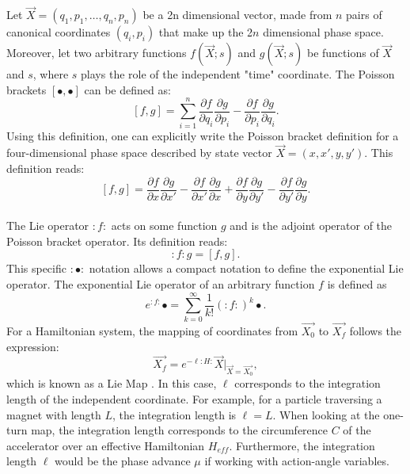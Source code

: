 Let $\vec{X} = \left( q_1,p_1,\dots,q_{n},p_{n} \right)$ be a 2n dimensional vector, made from $n$ pairs of canonical coordinates $(q_i,p_i)$ that make up the 2$n$ dimensional phase space. Moreover, let two arbitrary functions $f\left( \vec{X};s\right)$ and $g\left( \vec{X};s\right)$ be functions of $\vec{X}$ and $s$, where $s$ plays the role of the independent "time" coordinate. The Poisson brackets $\left[ \bullet , \bullet \right]$ can be defined as:
\begin{equation}
    \label{eq:ch2poisson}
    \left[ f,g \right] = \sum_{i=1}^{n} \frac{\partial f}{\partial q_i}\frac{\partial g}{\partial p_i} - \frac{\partial f}{\partial p_i}\frac{\partial g}{\partial q_i}. 
\end{equation}
Using this definition, one can explicitly write the Poisson bracket definition for a four-dimensional phase space described by state vector $\vec{X} = \left( x,x',y,y' \right)$. This definition reads: 
\begin{equation}
    \label{eq:ch2poisson1}
    \left[ f,g \right] = \frac{\partial f}{\partial x}\frac{\partial g}{\partial x'} - \frac{\partial f}{\partial x'}\frac{\partial g}{\partial x} + \frac{\partial f}{\partial y}\frac{\partial g}{\partial y'} - \frac{\partial f}{\partial y'}\frac{\partial g}{\partial y}. 
\end{equation}\\
The Lie operator $:f:$ acts on some function $g$ and is the adjoint operator of the Poisson bracket operator. Its definition reads:
\begin{equation}
    \label{eq:ch2lie1}
    :f:g = \left[ f,g \right].
\end{equation}
This specific $:\bullet:$ notation allows a compact notation to define the exponential Lie operator. The exponential Lie operator of an arbitrary function $f$ is defined as
\begin{equation}
    \label{eq:ch2explie1}
    e^{:f:}\bullet = \sum_{k=0}^{\infty}\frac{1}{k!}\left( :f: \right)^k \bullet.
\end{equation}
For a Hamiltonian system, the mapping of coordinates from $\vec{X_0}$ to $\vec{X_f}$ follows the expression:
\begin{equation}
    \label{eq:ch2liemap1}
    \vec{X_f}=e^{-\ell :H:}\vec{X}\bigg\rvert_{\vec{X}=\vec{X_0}},
\end{equation}
which is known as a Lie Map \cite{todd1}. In this case, $\ell$ corresponds to the integration length of the independent coordinate. For example, for a particle traversing a magnet with length $L$, the integration length is $\ell = L$. When looking at the one-turn map, the integration length corresponds to the circumference $C$ of the accelerator over an effective Hamiltonian $H_{eff}$. Furthermore, the integration length $\ell$ would be the phase advance $\mu$ if working with action-angle variables.\\ 

